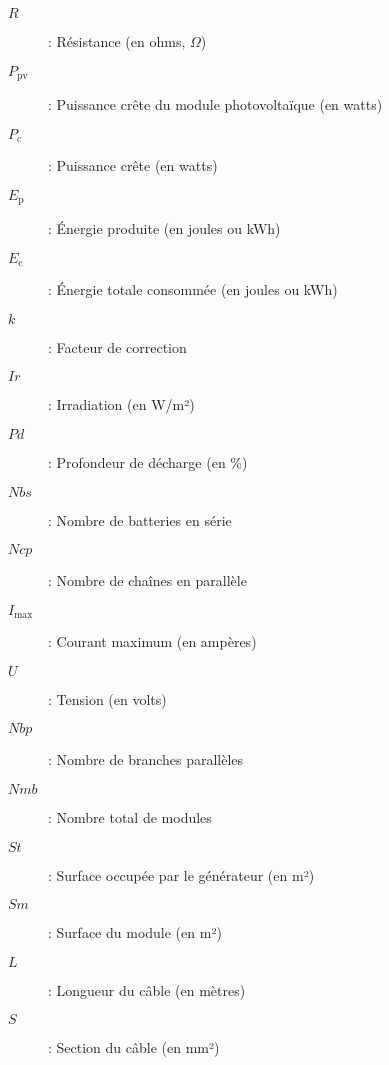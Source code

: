 \begin{multicols}{2}
\begin{description}
		\item[$R$] : Résistance (en ohms, $\Omega$)
		\item[$P_\text{pv}$] : Puissance crête du module photovoltaïque (en watts)
		\item[$P_\text{c}$] : Puissance crête (en watts)
		\item[$E_\text{p}$] : Énergie produite (en joules ou kWh)
		\item[$E_\text{c}$] : Énergie totale consommée (en joules ou kWh)
		\item[$k$] : Facteur de correction
		\item[$Ir$] : Irradiation (en W/m²)
		\item[$Pd$] : Profondeur de décharge (en \%)
		\item[$Nbs$] : Nombre de batteries en série
		\item[$Ncp$] : Nombre de chaînes en parallèle
		\item[$I_\text{max}$] : Courant maximum (en ampères)
		\item[$U$] : Tension (en volts)
		\item[$Nbp$] : Nombre de branches parallèles
		\item[$Nmb$] : Nombre total de modules
		\item[$St$] : Surface occupée par le générateur (en m²)
		\item[$Sm$] : Surface du module (en m²)
		\item[$L$] : Longueur du câble (en mètres)
		\item[$S$] : Section du câble (en mm²)
	\end{description}
\end{multicols}
\newpage
